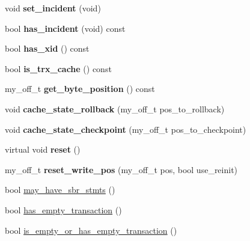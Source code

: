 \begin{DoxyCompactItemize}
\item 
\mbox{\label{classbinlog__cache__data_a757b7d8ea173b004f832645c82a8833d}} 
void {\bfseries set\+\_\+incident} (void)
\item 
\mbox{\label{classbinlog__cache__data_ac2b919b0c163920e9a942c3b3d3ef7e7}} 
bool {\bfseries has\+\_\+incident} (void) const
\item 
\mbox{\label{classbinlog__cache__data_aa79f43a56b9b0717811f658b6e7aaf65}} 
bool {\bfseries has\+\_\+xid} () const
\item 
\mbox{\label{classbinlog__cache__data_a3095d5e2d5c5df54dae651dc426227b2}} 
bool {\bfseries is\+\_\+trx\+\_\+cache} () const
\item 
\mbox{\label{classbinlog__cache__data_a171e99d541a3699b39b0576b23fe4210}} 
my\+\_\+off\+\_\+t {\bfseries get\+\_\+byte\+\_\+position} () const
\item 
\mbox{\label{classbinlog__cache__data_a6b3a72478140c920c69c7c176af7946d}} 
void {\bfseries cache\+\_\+state\+\_\+rollback} (my\+\_\+off\+\_\+t pos\+\_\+to\+\_\+rollback)
\item 
\mbox{\label{classbinlog__cache__data_a41f51603ab0998904669ce1ed80f8128}} 
void {\bfseries cache\+\_\+state\+\_\+checkpoint} (my\+\_\+off\+\_\+t pos\+\_\+to\+\_\+checkpoint)
\item 
\mbox{\label{classbinlog__cache__data_add4e571e2bcedc0c0c28034258d0a530}} 
virtual void {\bfseries reset} ()
\item 
\mbox{\label{classbinlog__cache__data_a44c4be111a16b3fa0a5f3f6403a0613a}} 
my\+\_\+off\+\_\+t {\bfseries reset\+\_\+write\+\_\+pos} (my\+\_\+off\+\_\+t pos, bool use\+\_\+reinit)
\item 
bool \mbox{\hyperlink{classbinlog__cache__data_a319126ba2342471ddccecca34d1e7964}{may\+\_\+have\+\_\+sbr\+\_\+stmts}} ()
\item 
bool \mbox{\hyperlink{classbinlog__cache__data_a335439d52a5ef045b96597ffb377c6b4}{has\+\_\+empty\+\_\+transaction}} ()
\item 
bool \mbox{\hyperlink{classbinlog__cache__data_a481b44b5de62e1c0f066cc40384c2050}{is\+\_\+empty\+\_\+or\+\_\+has\+\_\+empty\+\_\+transaction}} ()
\end{DoxyCompactItemize}
